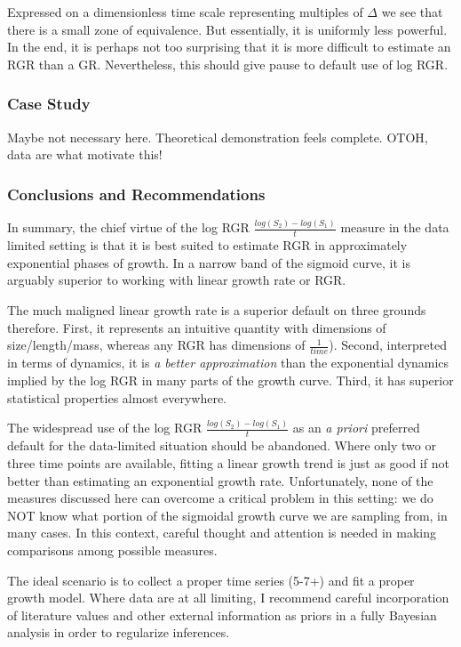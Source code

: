 \documentclass[]{article}
\begin{document}
Expressed on a dimensionless time scale representing multiples of
\(\Delta\) we see that there is a small zone of equivalence. But
essentially, it is uniformly less powerful. In the end, it is perhaps
not too surprising that it is more difficult to estimate an RGR than a
GR. Nevertheless, this should give pause to default use of log RGR.

\subsubsection{Case Study}\label{case-study}

Maybe not necessary here. Theoretical demonstration feels complete.
OTOH, data are what motivate this!

\subsubsection{Conclusions and
Recommendations}\label{conclusions-and-recommendations}

In summary, the chief virtue of the log RGR
\(\frac{log(S_2) - log(S_1)}{t}\) measure in the data limited setting is
that it is best suited to estimate RGR in approximately exponential
phases of growth. In a narrow band of the sigmoid curve, it is arguably
superior to working with linear growth rate or RGR.

The much maligned linear growth rate is a superior default on three
grounds therefore. First, it represents an intuitive quantity with
dimensions of size/length/mass, whereas any RGR has dimensions of
\(\frac{1}{time}\)). Second, interpreted in terms of dynamics, it is
\emph{a better approximation} than the exponential dynamics implied by
the log RGR in many parts of the growth curve. Third, it has superior
statistical properties almost everywhere.

The widespread use of the log RGR \(\frac{log(S_2) - log(S_1)}{t}\) as
an \emph{a priori} preferred default for the data-limited situation
should be abandoned. Where only two or three time points are available,
fitting a linear growth trend is just as good if not better than
estimating an exponential growth rate. Unfortunately, none of the
measures discussed here can overcome a critical problem in this setting:
we do NOT know what portion of the sigmoidal growth curve we are
sampling from, in many cases. In this context, careful thought and
attention is needed in making comparisons among possible measures.

The ideal scenario is to collect a proper time series (5-7+) and fit a
proper growth model. Where data are at all limiting, I recommend careful
incorporation of literature values and other external information as
priors in a fully Bayesian analysis in order to regularize inferences.
\end{document}
